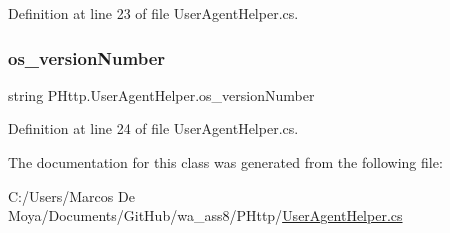 Definition at line 23 of file User\+Agent\+Helper.\+cs.

\mbox{\label{class_p_http_1_1_user_agent_helper_a918f1d0df9b9c697583f3e2d7ef52dea}} 
\subsubsection{\texorpdfstring{os\+\_\+version\+Number}{os\_versionNumber}}
{\footnotesize\ttfamily string P\+Http.\+User\+Agent\+Helper.\+os\+\_\+version\+Number\hspace{0.3cm}{\ttfamily [get]}}



Definition at line 24 of file User\+Agent\+Helper.\+cs.



The documentation for this class was generated from the following file\+:\begin{DoxyCompactItemize}
\item 
C\+:/\+Users/\+Marcos De Moya/\+Documents/\+Git\+Hub/wa\+\_\+ass8/\+P\+Http/\hyperlink{_user_agent_helper_8cs}{User\+Agent\+Helper.\+cs}\end{DoxyCompactItemize}
